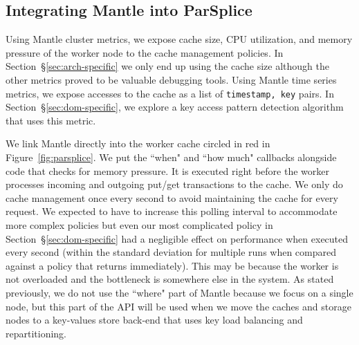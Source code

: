 \subsection{Integrating Mantle into ParSplice}

Using Mantle cluster metrics, we expose cache size, CPU utilization, and memory
pressure of the worker node to the cache management policies. In
Section~\S\ref{sec:arch-specific} we only end up using the cache size although
the other metrics proved to be valuable debugging tools. Using Mantle time
series metrics, we expose accesses to the cache as a list of \texttt{timestamp,
key} pairs. In Section~\S\ref{sec:dom-specific}, we explore a key access
pattern detection algorithm that uses this metric.

We link Mantle directly into the worker cache circled in red in
Figure~\ref{fig:parsplice}. We put the ``when" and ``how much" callbacks
alongside code that checks for memory pressure. It is executed right before the
worker processes incoming and outgoing put/get transactions to the cache. We
only do cache management once every second to avoid maintaining the cache for
every request. We expected to have to increase this polling interval to
accommodate more complex policies but even our most complicated policy in
Section~\S\ref{sec:dom-specific} had a negligible effect on performance when
executed every second (within the standard deviation for multiple runs when
compared against a policy that returns immediately). This may be because the
worker is not overloaded and the bottleneck is somewhere else in the system.
As stated previously, we do not use the ``where" part of Mantle because we
focus on a single node, but this part of the API will be used when we move the
caches and storage nodes to a key-values store back-end that uses key load
balancing and repartitioning.
